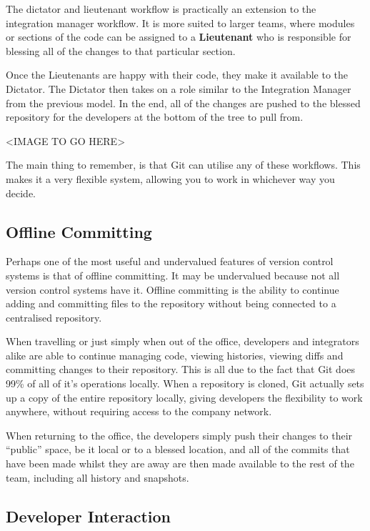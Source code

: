 The dictator and lieutenant workflow is practically an extension to the integration manager workflow.  It is more suited to larger teams, where modules or sections of the code can be assigned to a \textbf{Lieutenant} who is responsible for blessing all of the changes to that particular section.

Once the Lieutenants are happy with their code, they make it available to the Dictator.  The Dictator then takes on a role similar to the Integration Manager from the previous model.  In the end, all of the changes are pushed to the blessed repository for the developers at the bottom of the tree to pull from.

<IMAGE TO GO HERE>

The main thing to remember, is that Git can utilise any of these workflows.  This makes it a very flexible system, allowing you to work in whichever way you decide.

\subsection*{Offline Committing}

Perhaps one of the most useful and undervalued features of version control systems is that of offline committing.  It may be undervalued because not all version control systems have it.  Offline committing is the ability to continue adding and committing files to the repository without being connected to a centralised repository.  

When travelling or just simply when out of the office, developers and integrators alike are able to continue managing code, viewing histories, viewing diffs and committing changes to their repository.  This is all due to the fact that Git does 99\% of all of it's operations locally.  When a repository is cloned, Git actually sets up a copy of the entire repository locally, giving developers the flexibility to work anywhere, without requiring access to the company network.

When returning to the office, the developers simply push their changes to their “public” space, be it local or to a blessed location, and all of the commits that have been made whilst they are away are then made available to the rest of the team, including all history and snapshots.

\subsection*{Developer Interaction}

